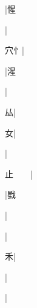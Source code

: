 \begin{multicols}{2}
{{}|{\cjk{}惺}\par
{}|{}\par
{\cjk{}{\cnsym{}　}穴{忄}}|{}\par
{}|{\cjk{}湦}\par
{}|{}\par
{\cjk{}{\cnsym{}　}{\cnsym{}　}厸}|{}\par
{\cjk{}{\cnsym{}　}{\cnsym{}　}女}|{}\par
{\cjk{}{\cnsym{}　}{\cnsym{}　}{\cnsym{}　}}|{}\par
{\cjk{}止{\cnsym{}　}{\cnsym{}　}}|{}\par
{\cjk{}{\cnsym{}　}{\cnsym{}　}{\cnsym{}　}}|{\cjk{}戥}\par
{\cjk{}{\cnsym{}　}{\cnsym{}　}{\cnsym{}　}}|{}\par
{\cjk{}{\cnsym{}　}{\cnsym{}　}{\cnsym{}　}}|{}\par
{\cjk{}{\cnsym{}　}{\cnsym{}　}禾}|{}\par
{\cjk{}{\cnsym{}　}{\cnsym{}　}{\cnsym{}　}}|{}\par
{\cjk{}{\cnsym{}　}{\cnsym{}　}{\cnsym{}　}}|{}\par
}
\end{multicols}
